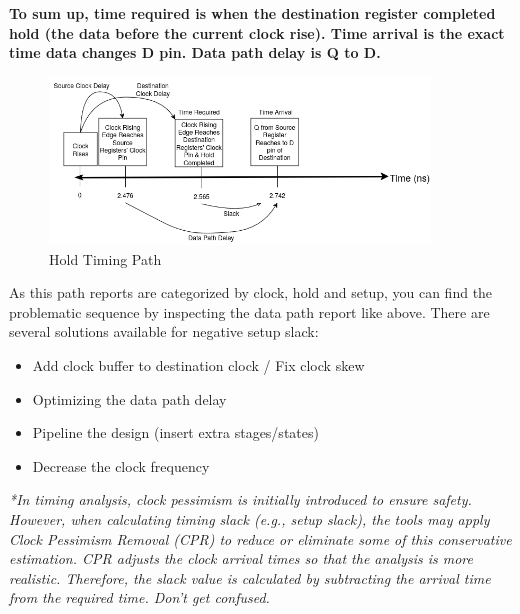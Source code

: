 \documentclass{report}
\begin{document}
\textbf{To sum up, time required is when the destination register completed hold (the data before the current clock rise). Time arrival is the exact time data changes D pin. Data path delay is Q to D.}

 \pagebreak
\begin{figure}[h!]
    \centering
    \includegraphics[width=0.9\textwidth]{images/hold_analys.png}
    \caption{Hold Timing Path}
    \label{fig:hold_timing_path}
\end{figure}


As this path reports are categorized by clock, hold and setup, you can find the problematic sequence by inspecting the data path report like above. 
There are several solutions available for negative setup slack:
\begin{itemize}
    \item Add clock buffer to destination clock / Fix clock skew
    \item Optimizing the data path delay
    \item Pipeline the design (insert extra stages/states)
    \item Decrease the clock frequency
\end{itemize}

\textit{*In timing analysis, clock pessimism is initially introduced to ensure safety. However, when calculating timing slack (e.g., setup slack), the tools may apply Clock Pessimism Removal (CPR) to reduce or eliminate some of this conservative estimation. CPR adjusts the clock arrival times so that the analysis is more realistic. Therefore, the slack value is calculated by subtracting the arrival time from the required time. Don't get confused.}
\end{document}
